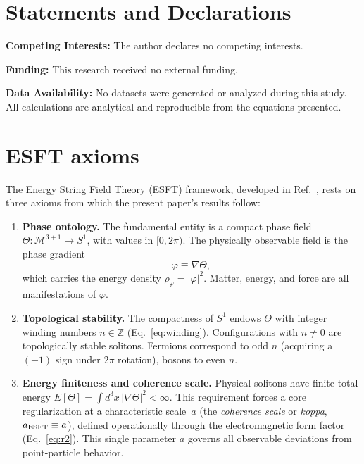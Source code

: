 ﻿\documentclass[a4paper,12pt]{article}
\begin{document}
\section*{Statements and Declarations}

\noindent\textbf{Competing Interests:} The author declares no competing interests.

\noindent\textbf{Funding:} This research received no external funding.

\noindent\textbf{Data Availability:} No datasets were generated or analyzed
during this study. All calculations are analytical and reproducible from
the equations presented.

\appendix
\section{ESFT axioms}
\label{app:esft}

The Energy String Field Theory (ESFT) framework, developed in
Ref.~\cite{ESFT}, rests on three axioms from which the present
paper's results follow:

\begin{enumerate}
  \item[\textbf{A1.}] \textbf{Phase ontology.}
    The fundamental entity is a compact phase field
    $\Theta:\mathcal{M}^{3+1}\to S^1$, with values in $[0,2\pi)$.
    The physically observable field is the phase gradient
    \begin{equation}
      \varphi \equiv \nabla\Theta,
      \label{eq:esft_phi}
    \end{equation}
    which carries the energy density $\rho_\varphi = |\varphi|^2$.
    Matter, energy, and force are all manifestations of $\varphi$.

  \item[\textbf{A2.}] \textbf{Topological stability.}
    The compactness of $S^1$ endows $\Theta$ with integer winding
    numbers $n\in\mathbb{Z}$ (Eq.~\eqref{eq:winding}).  Configurations
    with $n\neq 0$ are topologically stable solitons.  Fermions
    correspond to odd $n$ (acquiring a $(-1)$ sign under $2\pi$
    rotation), bosons to even $n$.

  \item[\textbf{A3.}] \textbf{Energy finiteness and coherence scale.}
    Physical solitons have finite total energy
    $E[\Theta]=\int d^3x\,|\nabla\Theta|^2 < \infty$.  This
    requirement forces a core regularization at a characteristic
    scale~$a$ (the \emph{coherence scale} or \emph{koppa},
    $a_{\rm ESFT}\equiv a$),
    defined operationally through the electromagnetic form factor
    (Eq.~\eqref{eq:r2}).  This single parameter $a$ governs all
    observable deviations from point-particle behavior.
\end{enumerate}
\end{document}
